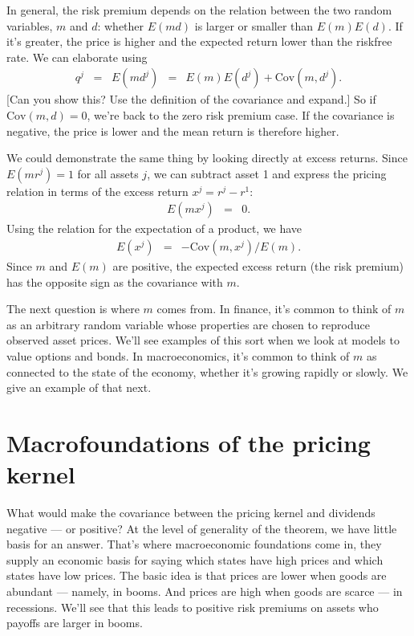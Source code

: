 \documentclass[11pt]{article}
\begin{document}
In general, the risk premium depends on the relation between
the two random variables, $m$ and $d$:
whether $E(md)$ is larger or smaller than $E(m) E(d)$.
If it's greater, the price is higher and the expected return lower
than the riskfree rate.
We can elaborate using
\begin{eqnarray*}
    q^j \;\;=\;\;    E(md^j) &=& E(m) E(d^j) + \mbox{Cov}(m,d^j).
\end{eqnarray*}
[Can you show this?  Use the definition of the covariance and expand.]
So if $\mbox{Cov}(m,d) =0$, we're back to the zero risk premium case.
If the covariance is negative, the price is lower and the mean return is therefore higher.

We could demonstrate the same thing by looking directly at excess returns.
Since $ E(mr^j) = 1$ for all assets $j$,
we can subtract asset 1 and express the pricing relation in terms
of the excess return $x^j = r^j - r^1 $:
\begin{eqnarray*}
    E( m x^j) &=& 0.
\end{eqnarray*}
Using the relation for the expectation of a product, we have
\begin{eqnarray*}
    E(x^j) &=& - \mbox{Cov}(m,x^j)/E(m) .
\end{eqnarray*}
Since $m$ and $E(m)$ are positive, the expected excess return
(the risk premium) has the opposite sign as the covariance with $m$.

The next question is where $m$ comes from.
In finance, it's common to think of $m$ as an arbitrary random variable
whose properties are chosen to reproduce observed asset prices.
We'll see examples of this sort when we look at models to value options and bonds.
In macroeconomics, it's common to think of $m$ as connected to
the state of the economy, whether it's growing rapidly or slowly.
We give an example of that next.


\section{Macrofoundations of the pricing kernel}

What would make the covariance between the pricing kernel and dividends negative --- or positive?
At the level of generality of the theorem, we have little basis for an answer.
That's where macroeconomic foundations come in, they supply an economic basis
for saying which states have high prices
and which states have low prices.
The basic idea is that prices are lower when goods are abundant ---
namely, in booms.
And prices are high when goods are scarce --- in recessions.
We'll see that this leads to positive risk premiums on assets who payoffs are
larger in booms.
\end{document}
